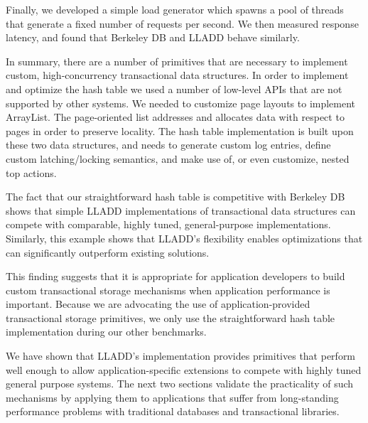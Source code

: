\documentclass[10pt,letterpaper,twocolumn,english]{article}
\newcommand{\yad}{LLADD\xspace}
\begin{document}

Finally, we developed a simple load generator which spawns a pool of threads that
generate a fixed number of requests per second.  We then measured
response latency, and found that Berkeley DB and \yad behave
similarly.

In summary, there are a number of primitives that are necessary to
implement custom, high-concurrency transactional data structures.  In
order to implement and optimize the hash table we used a number of
low-level APIs that are not supported by other systems.  We needed to
customize page layouts to implement ArrayList.  The page-oriented list
addresses and allocates data with respect to pages in order to
preserve locality.  The hash table implementation is built upon these
two data structures, and needs to generate custom log
entries, define custom latching/locking semantics, and make use of, or
even customize, nested top actions.

The fact that our straightforward hash table is competitive with Berkeley DB
shows that simple \yad implementations of transactional data structures
can compete with comparable, highly tuned, general-purpose
implementations.  Similarly, this example shows that \yad's flexibility 
enables optimizations that can significantly
outperform existing solutions.  

This finding suggests that it is appropriate for
application developers to build custom
transactional storage mechanisms when application performance is
important.  Because we are advocating the use of 
application-provided transactional storage primitives, we only use the 
straightforward hash table implementation during our other benchmarks.


We have shown that \yad's implementation provides primitives that perform 
well enough to allow application-specific extensions to compete with highly 
tuned general purpose systems.  The next two sections validate the 
practicality of such mechanisms by applying them to applications 
that suffer from long-standing performance problems with traditional databases
and transactional libraries.
\end{document}
